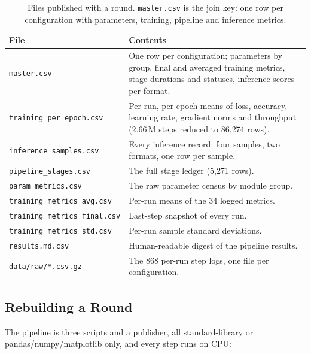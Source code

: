 \begin{table}[H]
\centering
\small
\caption{Files published with a round. \texttt{master.csv} is the join key: one row per configuration with parameters, training, pipeline and inference metrics.}
\label{tab:round-datasets}
\begin{tabularx}{\linewidth}{L{5.2cm}L{9.4cm}}
\toprule
File & Contents \\
\midrule
\texttt{master.csv} & One row per configuration; parameters by group, final and averaged training metrics, stage durations and statuses, inference scores per format. \\
\texttt{training\_per\_epoch.csv} & Per-run, per-epoch means of loss, accuracy, learning rate, gradient norms and throughput (2.66\,M steps reduced to 86{,}274 rows). \\
\texttt{inference\_samples.csv} & Every inference record: four samples, two formats, one row per sample. \\
\texttt{pipeline\_stages.csv} & The full stage ledger (5{,}271 rows). \\
\texttt{param\_metrics.csv} & The raw parameter census by module group. \\
\texttt{training\_metrics\_avg.csv} & Per-run means of the 34 logged metrics. \\
\texttt{training\_metrics\_final.csv} & Last-step snapshot of every run. \\
\texttt{training\_metrics\_std.csv} & Per-run sample standard deviations. \\
\texttt{results.md.csv} & Human-readable digest of the pipeline results. \\
\texttt{data/raw/*.csv.gz} & The 868 per-run step logs, one file per configuration. \\
\bottomrule
\end{tabularx}
\end{table}

\subsection{Rebuilding a Round}

The pipeline is three scripts and a publisher, all standard-library or pandas/numpy/matplotlib only, and every step runs on CPU:

